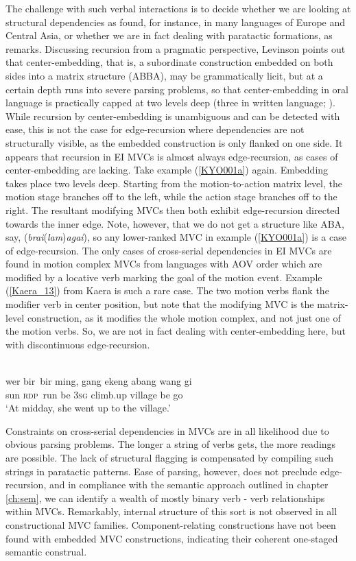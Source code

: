 The challenge with such verbal interactions is to decide whether we are looking at structural dependencies as found, for instance, in many languages of Europe and Central Asia, or whether we are in fact dealing with paratactic formations, as \citep[151]{levinson2013recursion} remarks. Discussing recursion from a pragmatic perspective, Levinson points out that center-embedding, that is, a subordinate construction embedded on both sides into a matrix structure (ABBA), may be grammatically licit, but at a certain depth runs into severe parsing problems, so that center-embedding in oral language is practically capped at two levels deep (three in written language; \citealt[154]{levinson2013recursion}). While recursion by center-embedding is unambiguous and can be detected with ease, this is not the case for edge-recursion where dependencies are not structurally visible, as the embedded construction is only flanked on one side. It appears that recursion in EI MVCs is almost always edge-recursion, as cases of center-embedding are lacking. Take example (\ref{KYO001a}) again. Embedding takes place two levels deep. Starting from the motion-to-action matrix level, the motion stage branches off to the left, while the action stage branches off to the right. The resultant modifying MVCs then both exhibit edge-recursion directed towards the inner edge. Note, however, that we do not get a structure like ABA, say, (\textit{brai}(\textit{lam})\textit{agai}), so any lower-ranked MVC in example (\ref{KYO001a}) is a case of edge-recursion. The only cases of cross-serial dependencies in EI MVCs are found in motion complex MVCs from languages with AOV order which are modified by a locative verb marking the goal of the motion event. Example (\ref{Kaera_13}) from Kaera is such a rare case. The two motion verbs flank the modifier verb in center position, but note that the modifying MVC is the matrix-level construction, as it modifies the whole motion complex, and not just one of the motion verbs. So, we are not in fact dealing with center-embedding here, but with discontinuous edge-recursion.

\ea \label{Kaera_13}
\\
\gll wer bir~bir ming, gang ekeng abang wang gi \\
sun \textsc{rdp}~run be 3\textsc{sg} climb.up village be go \\
\glft `At midday, she went up to the village.'\\ 
\z

Constraints on cross-serial dependencies in MVCs are in all likelihood due to obvious parsing problems. The longer a string of verbs gets, the more readings are possible. The lack of structural flagging is compensated by compiling such strings in paratactic patterns. Ease of parsing, however, does not preclude edge-recursion, and in compliance with the semantic approach outlined in chapter \ref{ch:sem}, we can identify a wealth of mostly binary verb - verb relationships within MVCs. Remarkably, internal structure of this sort is not observed in all constructional MVC families. Component-relating constructions have not been found with embedded MVC constructions, indicating their coherent one-staged semantic construal.

